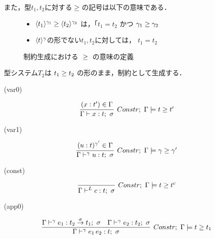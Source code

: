 また，型$t_1, t_2$に対する${} \ge {}$の記号は以下の意味である．

\begin{figure}[H]
  \centering
  \begin{itemize}
  \item ${\langle{t_1}\rangle^{\gamma_1}} \ge {\langle{t_2}\rangle^{\gamma_2}}$
    は，「$t_1=t_2$ かつ ${\gamma_1} \ge {\gamma_2}$
  \item $\langle{t}\rangle^{\gamma}$の形でない$t_1,t_2$に対しては，
    $t_1 = t_2$
  \end{itemize}

  \caption{制約生成における ${} \ge {}$ の意味の定義}
  \label{fig:typeinf_longer_def}
\end{figure}

型システム$T_2$は ${t_1} \ge {t_2}$ の形のまま，制約として生成する．






(var0)

\[
  \infer[Constr;~\Gamma \models \longer{t}{t'}]
  {\Gamma \vdash x:t;~\sigma}
  {(x:t') \in \Gamma
  }
\]

(var1)

\[
  \infer[Constr;~\Gamma \models \longer{\gamma}{\gamma'}]
  {\Gamma \vdash^{\gamma} u:t;~\sigma}
  {(u:t)^{\gamma'} \in \Gamma
  }
\]

(const)

\[
  \infer[Constr;~\Gamma \models \longer{t}{t^c}]
  {\Gamma \vdash^{L} c:t;~\sigma}
  {}
\]

(app0)

\[
  \infer[Constr;~\Gamma \models \longer{t}{t_1}]
  {\Gamma \vdash^\gamma e_1 \, e_2 : t;~\sigma}
  {\Gamma \vdash^\gamma e_1 : \funT{t_2}{t_1}{\sigma};~\sigma
    &\Gamma \vdash^\gamma e_2 : t_2;~\sigma
  }
\]

